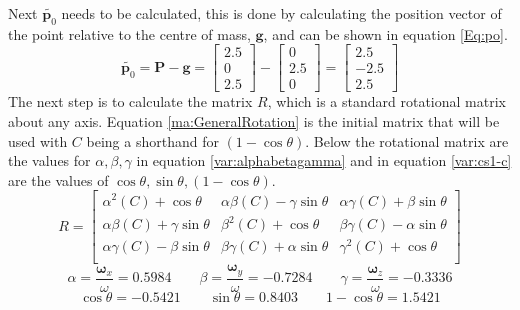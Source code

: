 Next $\tilde{\mathbf{p}_{0}}$ needs to be calculated, this is done by calculating the position vector of the point relative to the centre of mass,  $\mathbf{g}$, and can be shown in equation \ref{Eq:po}.
\begin{equation}\label{Eq:po}
	\tilde{\mathbf{p}_{0}} = \mathbf{P} - \mathbf{g} = 
	\begin{bmatrix}
		2.5 \\
		0 	 \\
		2.5 
	\end{bmatrix} -
	\begin{bmatrix}
		0 \\
	 	2.5 	 \\
		0 
	\end{bmatrix} =
	\begin{bmatrix}
		 2.5 \\
		-2.5 	 \\
		 2.5 
	\end{bmatrix}
\end{equation}
The next step is to calculate the matrix $R$, which is a standard rotational matrix about any axis.
Equation \ref{ma:GeneralRotation} is the initial matrix that will be used with $C$ being a shorthand for $(1-\cos\theta)$.
Below the rotational matrix are the values for $\alpha, \beta, \gamma$ in equation \ref{var:alphabetagamma} and in equation \ref{var:cs1-c} are the values of $\cos\theta, \sin\theta, (1-\cos\theta)$.
\begin{equation}\label{ma:GeneralRotation}
	R = 
	\begin{bmatrix}
		{\alpha}^{2}(C) + \cos\theta & 
		\alpha\beta(C) - \gamma\sin\theta & 
		\alpha\gamma(C) + \beta\sin\theta \\
		
		\alpha\beta(C) + \gamma\sin\theta & 
		{\beta}^{2}(C) + \cos\theta & 
		\beta\gamma(C) - \alpha\sin\theta \\
		
		\alpha\gamma(C) - \beta\sin\theta & 
		\beta\gamma(C) + \alpha\sin\theta & 
		{\gamma}^{2}(C) + \cos\theta \\
	\end{bmatrix}
\end{equation}
\begin{equation}\label{var:alphabetagamma}
	\alpha = \frac{\boldsymbol\omega_{x}}{\omega} = 0.5984
	\qquad
	\beta = \frac{\boldsymbol\omega_{y}}{\omega} = -0.7284
	\qquad
	\gamma = \frac{\boldsymbol\omega_{z}}{\omega} = -0.3336
\end{equation}
\begin{equation}\label{var:cs1-c}
	\cos\theta = -0.5421
	\qquad
	\sin\theta = 0.8403
	\qquad
	1-\cos\theta = 1.5421
\end{equation}
